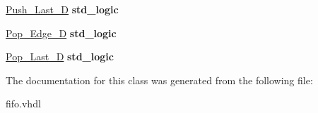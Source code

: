 \begin{DoxyCompactItemize}
\item 
\mbox{\label{classFIFO_1_1behavioural_aa96770f6b59575232044f06201031ecb}} 
\hyperlink{classFIFO_1_1behavioural_aa96770f6b59575232044f06201031ecb}{Push\+\_\+\+Last\+\_\+D} {\bfseries \textcolor{vhdlchar}{std\+\_\+logic}\textcolor{vhdlchar}{ }} 
\item 
\mbox{\label{classFIFO_1_1behavioural_a6a469f178f2b0e334e1be72ba691d1cc}} 
\hyperlink{classFIFO_1_1behavioural_a6a469f178f2b0e334e1be72ba691d1cc}{Pop\+\_\+\+Edge\+\_\+D} {\bfseries \textcolor{vhdlchar}{std\+\_\+logic}\textcolor{vhdlchar}{ }} 
\item 
\mbox{\label{classFIFO_1_1behavioural_a1a0c00d4fb90ac5e02e3c2d64ed3b8ba}} 
\hyperlink{classFIFO_1_1behavioural_a1a0c00d4fb90ac5e02e3c2d64ed3b8ba}{Pop\+\_\+\+Last\+\_\+D} {\bfseries \textcolor{vhdlchar}{std\+\_\+logic}\textcolor{vhdlchar}{ }} 
\end{DoxyCompactItemize}


The documentation for this class was generated from the following file\+:\begin{DoxyCompactItemize}
\item 
fifo.\+vhdl\end{DoxyCompactItemize}
